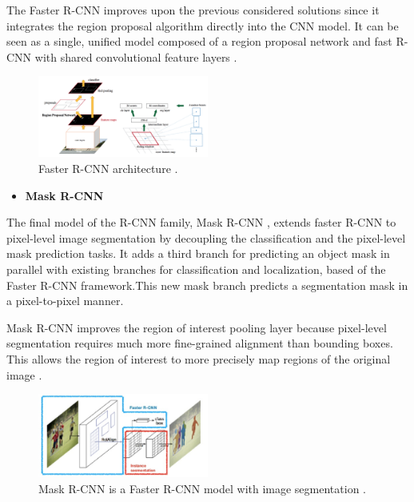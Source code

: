     \label{sec:fasterrcnn}

    \par The Faster R-CNN \cite{ren2015faster} improves upon the previous considered solutions since it integrates the region proposal algorithm directly into the CNN model. It can be seen as a single, unified model composed of a region proposal network and fast R-CNN with shared convolutional feature layers \cite{weng2017detection3}.

    \begin{figure}[H]
        \centering
        \captionsetup{justification=centering}
        \includegraphics[width=0.5\textwidth]{Sections/2StateOfTheArt/2_images/faster-RCNN.png}
        \caption[Faster R-CNN architecture.]{Faster R-CNN architecture \cite{weng2017detection3}.} 
    \end{figure}
    
    \begin{itemize}
        \item\textbf{Mask R-CNN}
    \end{itemize}
    

    \par The final model of the R-CNN family, Mask R-CNN \cite{he2017mask}, extends faster R-CNN to pixel-level image segmentation by decoupling the classification and the pixel-level mask prediction tasks. It adds a third branch for predicting an object mask in parallel with existing branches for classification and localization, based of the Faster R-CNN framework.This new mask branch predicts a segmentation mask in a pixel-to-pixel manner.
    \par Mask R-CNN improves the region of interest pooling layer because pixel-level segmentation requires much more fine-grained alignment than bounding boxes. This allows the region of interest to more precisely map regions of the original image \cite{weng2017detection3}.

    \begin{figure}[H]
        \centering
        \captionsetup{justification=centering}
        \includegraphics[width=0.5\textwidth]{Sections/2StateOfTheArt/2_images/mask-rcnn.png}
        \caption[Mask R-CNN is a Faster R-CNN model]{Mask R-CNN is a Faster R-CNN model with image segmentation \cite{weng2017detection3}.} 
    \end{figure}

    \newpage  

